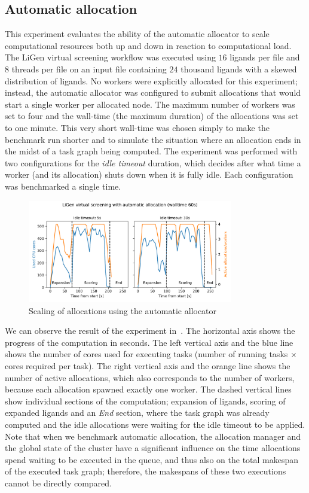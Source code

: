 \subsection{Automatic allocation}
\label{sec:hq-exp-autoalloc}
This experiment evaluates the ability of the automatic allocator to scale computational resources
both up and down in reaction to computational load. The LiGen virtual screening workflow was
executed using $16$ ligands per file and $8$ threads per
file on an input file containing $24$ thousand ligands with a skewed
distribution of ligands. No workers were explicitly allocated for this experiment; instead, the
automatic allocator was configured to submit allocations that would start a single worker per
allocated node. The maximum number of workers was set to four and the wall-time (the maximum
duration) of the allocations was set to one minute. This very short wall-time was chosen simply to
make the benchmark run shorter and to simulate the situation where an allocation ends in the midst
of a task graph being computed. The experiment was performed with two configurations for the
\emph{idle timeout} duration, which decides after what time a worker (and its allocation) shuts
down when it is fully idle. Each configuration was benchmarked a single time.

\begin{figure}[h]
	\centering
	\includegraphics[width=0.8\textwidth]{imgs/hq/charts/ligen-autoalloc-stats}
	\caption{Scaling of allocations using the automatic allocator}
	\label{fig:hq-ligen-autoalloc}
\end{figure}

We can observe the result of the experiment in~. The horizontal axis shows
the progress of the computation in seconds. The left vertical axis and the blue line shows the
number of cores used for executing tasks (number of running tasks $\times$ cores
required per task). The right vertical axis and the orange line shows the number of active
allocations, which also corresponds to the number of workers, because each allocation spawned
exactly one worker. The dashed vertical lines show individual sections of the computation;
expansion of ligands, scoring of expanded ligands and an \emph{End} section, where the
task graph was already computed and the idle allocations were waiting for the idle timeout to be
applied. Note that when we benchmark automatic allocation, the allocation manager and the global
state of the cluster have a significant influence on the time allocations spend waiting to be
executed in the queue, and thus also on the total makespan of the executed task graph; therefore,
the makespans of these two executions cannot be directly compared.

